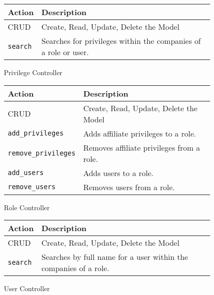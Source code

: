 \begin{figure}[htb]
\begin{center}
\begin{tabular}{ | l | p{8cm} | }
  \hline
    \textbf{Action} & \textbf{Description} \\ \hline
    CRUD & Create, Read, Update, Delete the Model \\ \hline
    \verb+search+ & Searches for privileges within the companies of a role or user.\\ \hline
\end{tabular}
\caption{Privilege Controller}
\label{tab:privilege_controller_actions}
\end{center}
\end{figure}

\begin{figure}[htb]
\begin{center}
\begin{tabular}{ | l | p{8cm} | }
  \hline
    \textbf{Action} & \textbf{Description} \\ \hline
    CRUD & Create, Read, Update, Delete the Model \\ \hline
    \verb+add_privileges+ & Adds affiliate privileges to a role.\\ \hline
    \verb+remove_privileges+ & Removes affiliate privileges from a role.\\ \hline
    \verb+add_users+ & Adds users to a role.\\ \hline
    \verb+remove_users+ & Removes users from a role.\\ \hline
\end{tabular}
\caption{Role Controller}
\label{tab:role_controller_actions}
\end{center}
\end{figure}

\begin{figure}[htb]
\begin{center}
\begin{tabular}{ | l | p{8cm} | }
  \hline
    \textbf{Action} & \textbf{Description} \\ \hline
    CRUD & Create, Read, Update, Delete the Model \\ \hline
    \verb+search+ & Searches by full name for a user within the companies of a role.\\ \hline
\end{tabular}
\caption{User Controller}
\label{tab:user_controller_actions}
\end{center}
\end{figure}